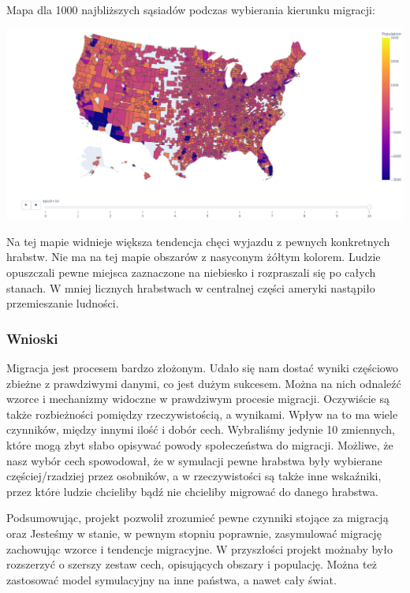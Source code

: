 \documentclass[a4paper,12pt]{article}
\begin{document}
Mapa dla 1000 najbliższych sąsiadów podczas wybierania kierunku migracji:
\begin{center}
    \includegraphics*[width=15cm]{./pictures/population_k1000.png}
\end{center}
Na tej mapie widnieje większa tendencja chęci wyjazdu z pewnych konkretnych hrabstw. Nie ma na tej mapie obszarów z nasyconym żółtym kolorem. Ludzie opuszczali pewne miejsca zaznaczone na niebiesko i rozpraszali się po całych stanach. W mniej licznych hrabstwach w centralnej części ameryki nastąpiło przemieszanie ludności.


\subsubsection*{Wnioski}
Migracja jest procesem bardzo złożonym. Udało się nam dostać wyniki częściowo zbieżne z prawdziwymi danymi, co jest dużym sukcesem. Można na nich odnaleźć wzorce i mechanizmy widoczne w prawdziwym procesie migracji. Oczywiście są także rozbieżności pomiędzy rzeczywistością, a wynikami. Wpływ na to ma wiele czynników, między innymi ilość i dobór cech. Wybraliśmy jedynie 10 zmiennych, które mogą zbyt słabo opisywać powody społeczeństwa do migracji. Możliwe, że nasz wybór cech spowodował, że w symulacji pewne hrabstwa były wybierane częściej/rzadziej przez osobników, a w rzeczywistości są także inne wskaźniki, przez które ludzie chcieliby bądź nie chcieliby migrować do danego hrabstwa.     

Podsumowując, projekt pozwolił zrozumieć pewne czynniki stojące za migracją oraz 
Jesteśmy w stanie, w pewnym stopniu poprawnie, zasymulować migrację zachowując wzorce i tendencje migracyjne. W przyszłości projekt możnaby było rozszerzyć o szerszy zestaw cech, opisujących obszary i populację. Można też zastosować model symulacyjny na inne państwa, a nawet cały świat. 

\newpage
\printbibliography[title=Bibliografia]
\end{document}
